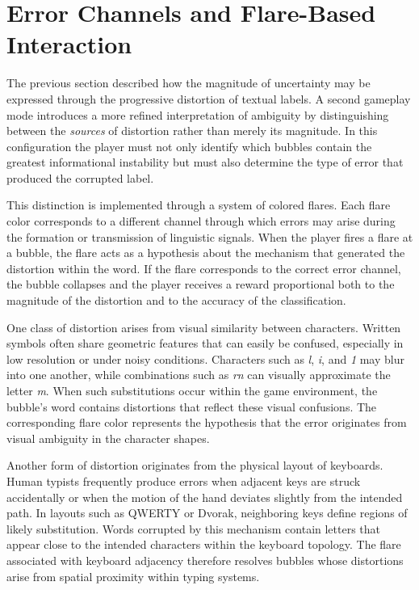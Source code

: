 \documentclass[11pt]{article}
\begin{document}
\section{Error Channels and Flare-Based Interaction}

The previous section described how the magnitude of uncertainty may be expressed through the progressive distortion of textual labels. A second gameplay mode introduces a more refined interpretation of ambiguity by distinguishing between the \emph{sources} of distortion rather than merely its magnitude. In this configuration the player must not only identify which bubbles contain the greatest informational instability but must also determine the type of error that produced the corrupted label.

This distinction is implemented through a system of colored flares. Each flare color corresponds to a different channel through which errors may arise during the formation or transmission of linguistic signals. When the player fires a flare at a bubble, the flare acts as a hypothesis about the mechanism that generated the distortion within the word. If the flare corresponds to the correct error channel, the bubble collapses and the player receives a reward proportional both to the magnitude of the distortion and to the accuracy of the classification.

One class of distortion arises from visual similarity between characters. Written symbols often share geometric features that can easily be confused, especially in low resolution or under noisy conditions. Characters such as \emph{l}, \emph{i}, and \emph{1} may blur into one another, while combinations such as \emph{rn} can visually approximate the letter \emph{m}. When such substitutions occur within the game environment, the bubble's word contains distortions that reflect these visual confusions. The corresponding flare color represents the hypothesis that the error originates from visual ambiguity in the character shapes.

Another form of distortion originates from the physical layout of keyboards. Human typists frequently produce errors when adjacent keys are struck accidentally or when the motion of the hand deviates slightly from the intended path. In layouts such as QWERTY or Dvorak, neighboring keys define regions of likely substitution. Words corrupted by this mechanism contain letters that appear close to the intended characters within the keyboard topology. The flare associated with keyboard adjacency therefore resolves bubbles whose distortions arise from spatial proximity within typing systems.
\end{document}
